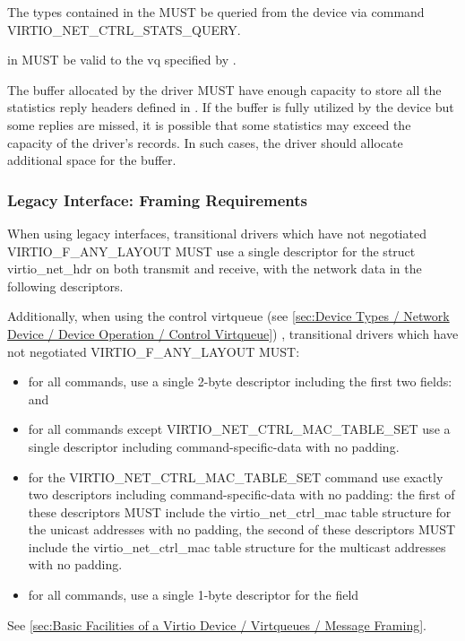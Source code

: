 
The types contained in the  MUST be queried from the device
via command VIRTIO_NET_CTRL_STATS_QUERY.

 in  MUST be valid to the
vq specified by .

The  buffer allocated by the driver MUST have
enough capacity to store all the statistics reply headers defined in
. If the
 buffer is fully utilized by the device but some
replies are missed, it is possible that some statistics may exceed the capacity
of the driver's records. In such cases, the driver should allocate additional
space for the  buffer.

\subsubsection{Legacy Interface: Framing Requirements}\label{sec:Device
Types / Network Device / Legacy Interface: Framing Requirements}

When using legacy interfaces, transitional drivers which have not
negotiated VIRTIO_F_ANY_LAYOUT MUST use a single descriptor for the
struct virtio_net_hdr on both transmit and receive, with the
network data in the following descriptors.

Additionally, when using the control virtqueue (see \ref{sec:Device
Types / Network Device / Device Operation / Control Virtqueue})
, transitional drivers which have not
negotiated VIRTIO_F_ANY_LAYOUT MUST:
\begin{itemize}
\item for all commands, use a single 2-byte descriptor including the first two
fields:  and 
\item for all commands except VIRTIO_NET_CTRL_MAC_TABLE_SET
use a single descriptor including command-specific-data
with no padding.
\item for the VIRTIO_NET_CTRL_MAC_TABLE_SET command use exactly
two descriptors including command-specific-data with no padding:
the first of these descriptors MUST include the
virtio_net_ctrl_mac table structure for the unicast addresses with no padding,
the second of these descriptors MUST include the
virtio_net_ctrl_mac table structure for the multicast addresses
with no padding.
\item for all commands, use a single 1-byte descriptor for the
 field
\end{itemize}

See \ref{sec:Basic
Facilities of a Virtio Device / Virtqueues / Message Framing}.
